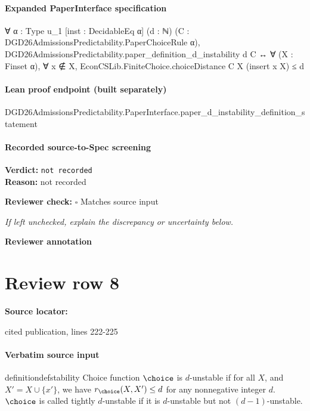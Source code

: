 \documentclass[10pt]{article}
\newcommand{\reviewerbox}{%
  \par\noindent\fbox{\parbox{0.96\linewidth}{\rule{0pt}{0.38in}}}\par
}
\newcommand{\reviewmatch}[1]{%
  \par\noindent\textbf{Reviewer check:} $\square$\; #1\par
  \noindent\emph{If left unchecked, explain the discrepancy or uncertainty below.}\par
}
\begin{document}
\paragraph{Expanded PaperInterface specification}
\begin{ReviewVerbatim}
∀ {α : Type u_1} [inst : DecidableEq α] (d : ℕ) (C : DGD26AdmissionsPredictability.PaperChoiceRule α),
  DGD26AdmissionsPredictability.paper_definition_d_instability d C ↔
    ∀ (X : Finset α), ∀ x ∉ X, EconCSLib.FiniteChoice.choiceDistance C X (insert x X) ≤ d
\end{ReviewVerbatim}

\paragraph{Lean proof endpoint (built separately)}\begin{ReviewVerbatim}
DGD26AdmissionsPredictability.PaperInterface.paper_d_instability_definition_statement
\end{ReviewVerbatim}

\paragraph{Recorded source-to-Spec screening}
\textbf{Verdict:} \texttt{not recorded}
\\
\textbf{Reason:} not recorded
\reviewmatch{Matches source input}
\noindent\textbf{Reviewer annotation}\par
\reviewerbox
\clearpage
\hypertarget{source-claim-62d00d89c6cc151a}{}
\section*{Review row 8}
\textbf{Source locator:} {\footnotesize\raggedright cited publication, lines 222-\allowbreak{}225\par}
\paragraph{Verbatim source input}
\begin{ReviewVerbatim}
\begin{restatable}[$d$-Instability]{definition}{defstability}
\label{def:d-instability}
Choice function $\choice$ is $d$-unstable if for all $X$, and $X' = X \cup \{x'\}$, we have $r_\choice(X, X') \leq d$ for any nonnegative integer $d$. $\choice$ is called tightly $d$-unstable if it is $d$-unstable but not $(d-1)$-unstable.
\end{restatable}
\end{ReviewVerbatim}
\end{document}
